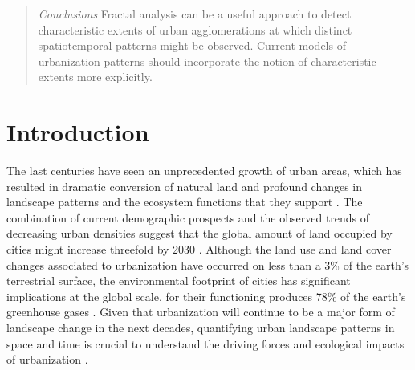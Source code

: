 \begin{abstract}
  \emph{Conclusions} %
  Fractal analysis can be a useful approach to detect characteristic extents of urban agglomerations at which distinct spatiotemporal patterns might be observed. Current models of urbanization patterns should incorporate the notion of characteristic extents more explicitly.



\end{abstract}

\section*{Introduction}

The last centuries have seen an unprecedented growth of urban areas, which has resulted in dramatic conversion of natural land and profound changes in landscape patterns and the ecosystem functions that they support \citep{alberti2005effects}.
The combination of current demographic prospects and the observed trends of decreasing urban densities suggest that the global amount of land occupied by cities might increase threefold by 2030 \citep{angel2005dynamics}.
Although the land use and land cover changes associated to urbanization have occurred on less than a 3\% of the earth's terrestrial surface, the environmental footprint of cities has significant implications at the global scale, for their functioning produces 78\% of the earth's greenhouse gases \cite{grimm2008global}.
Given that urbanization will continue to be a major form of landscape change in the next decades, quantifying urban landscape patterns in space and time is crucial to understand the driving forces and ecological impacts of urbanization \citep{wu2014urban}. 

